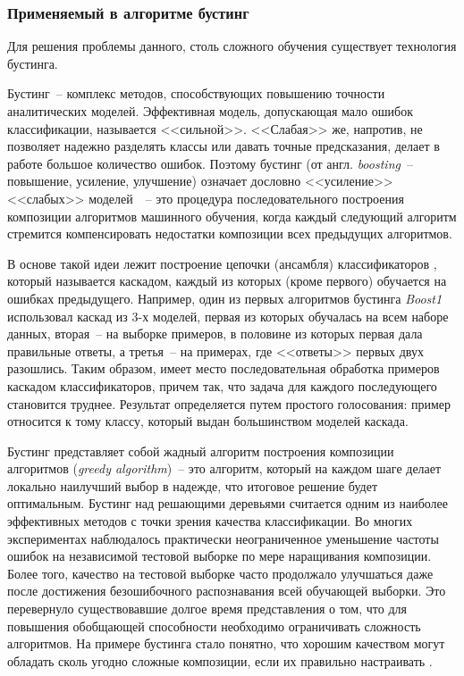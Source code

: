 \subsubsection{Применяемый в алгоритме бустинг}

Для решения проблемы данного, столь сложного обучения существует технология бустинга. 

Бустинг~-- комплекс методов, способствующих повышению точности аналитических моделей. Эффективная модель, допускающая мало ошибок
классификации, называется <<сильной>>. <<Слабая>> же, напротив, не позволяет надежно разделять классы или давать точные предсказания,
делает в работе большое количество ошибок. Поэтому бустинг (от англ. \textit{boosting}~-- повышение, усиление, улучшение) означает дословно
<<усиление>> <<слабых>> моделей~\cite{viola_jones_2}~-- это процедура последовательного построения композиции алгоритмов машинного обучения, когда
каждый следующий алгоритм стремится компенсировать недостатки композиции всех предыдущих алгоритмов.

В основе такой идеи лежит построение цепочки (ансамбля) классификаторов \cite{viola_jones_2}, который называется каскадом, каждый из которых
(кроме первого) обучается на ошибках предыдущего. Например, один из первых алгоритмов бустинга \textit{Boost1} использовал каскад из 3-х
моделей, первая из которых обучалась на всем наборе данных, вторая~-- на выборке примеров, в половине из которых первая дала
правильные ответы, а третья~-- на примерах, где <<ответы>> первых двух разошлись. Таким образом, имеет место последовательная
обработка примеров каскадом классификаторов, причем так, что задача для каждого последующего становится труднее. Результат
определяется путем простого голосования: пример относится к тому классу, который выдан большинством моделей каскада.

Бустинг представляет собой жадный алгоритм построения композиции алгоритмов (\textit{greedy algorithm})~-- это алгоритм, который на каждом
шаге делает локально наилучший выбор в надежде, что итоговое решение будет оптимальным. Бустинг над решающими деревьями считается
одним из наиболее эффективных методов с точки зрения качества классификации. Во многих экспериментах наблюдалось практически
неограниченное уменьшение частоты ошибок на независимой тестовой выборке по мере наращивания композиции. Более того, качество на
тестовой выборке часто продолжало улучшаться даже после достижения безошибочного распознавания всей обучающей выборки. Это
перевернуло существовавшие долгое время представления о том, что для повышения обобщающей способности необходимо ограничивать
сложность алгоритмов. На примере бустинга стало понятно, что хорошим качеством могут обладать сколь угодно сложные композиции,
если их правильно настраивать \cite{viola_jones_2}.

